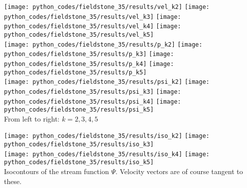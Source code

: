\newpage
\begin{center}
\texttt{[image: python\_codes/fieldstone\_35/results/vel\_k2]}
\texttt{[image: python\_codes/fieldstone\_35/results/vel\_k3]}
\texttt{[image: python\_codes/fieldstone\_35/results/vel\_k4]}
\texttt{[image: python\_codes/fieldstone\_35/results/vel\_k5]}\\
\texttt{[image: python\_codes/fieldstone\_35/results/p\_k2]}
\texttt{[image: python\_codes/fieldstone\_35/results/p\_k3]}
\texttt{[image: python\_codes/fieldstone\_35/results/p\_k4]}
\texttt{[image: python\_codes/fieldstone\_35/results/p\_k5]}\\
\texttt{[image: python\_codes/fieldstone\_35/results/psi\_k2]}
\texttt{[image: python\_codes/fieldstone\_35/results/psi\_k3]}
\texttt{[image: python\_codes/fieldstone\_35/results/psi\_k4]}
\texttt{[image: python\_codes/fieldstone\_35/results/psi\_k5]}\\
{\captionfont From left to right: $k=2,3,4,5$}
\end{center}



\begin{center}
\texttt{[image: python\_codes/fieldstone\_35/results/iso\_k2]}
\texttt{[image: python\_codes/fieldstone\_35/results/iso\_k3]}\\
\texttt{[image: python\_codes/fieldstone\_35/results/iso\_k4]}
\texttt{[image: python\_codes/fieldstone\_35/results/iso\_k5]}\\
{\captionfont Isocontours of the stream function $\Psi$. Velocity vectors
are of course tangent to these.}
\end{center}







